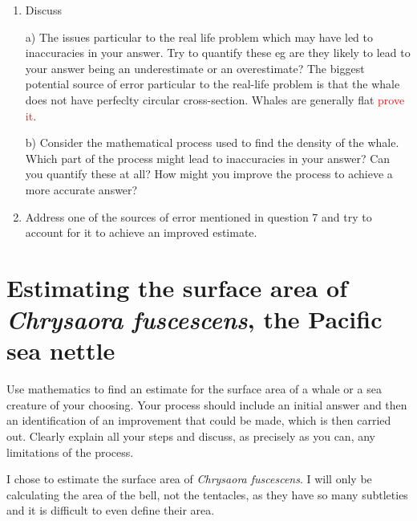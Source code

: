 \documentclass[fleqn]{article}
\newcommand\todo[1]{\textcolor{red}{#1}}
\newcommand\chry{\textit{Chrysaora fuscescens}}
\begin{document}
\begin{enumerate}
  \item	Discuss 

  a) The issues particular to the real life problem which may have led to inaccuracies in your answer.  Try to quantify these eg are they likely to lead to your answer being an underestimate or an overestimate?
  The biggest potential source of error particular to the real-life problem is that the whale does not have perfeclty circular cross-section. Whales are generally flat \todo{prove it}.

  b) Consider the mathematical process used to find the density of the whale.  Which part of the process might lead to inaccuracies in your answer?  Can you quantify these at all?  How might you improve the process to achieve a more accurate answer?

  \item	Address one of the sources of error mentioned in question 7 and try to account for it to achieve an improved estimate.

\end{enumerate}

\section{Estimating the surface area of \chry, the Pacific sea nettle}

Use mathematics to find an estimate for the surface area of a whale or a sea creature of your choosing. Your process should include an initial answer and then an identification of an improvement that could be made, which is then carried out. Clearly explain all your steps and discuss, as precisely as you can, any limitations of the process.

I chose to estimate the surface area of \chry. I will only be calculating the area of the bell, not the tentacles, as they have so many subtleties and it is difficult to even define their area.
\end{document}
